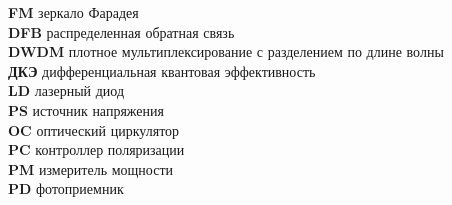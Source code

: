 \textbf{FM} зеркало Фарадея\\ 
\textbf{DFB} распределенная обратная связь\\ 
\textbf{DWDM} плотное мультиплексирование с разделением по длине волны\\ 
\textbf{ДКЭ} дифференциальная квантовая эффективность\\ 
\textbf{LD} лазерный диод\\ 
\textbf{PS} источник напряжения\\ 
\textbf{OC} оптический циркулятор\\ 
\textbf{PC} контроллер поляризации\\
\textbf{PM} измеритель мощности\\ 
\textbf{PD} фотоприемник\\ 